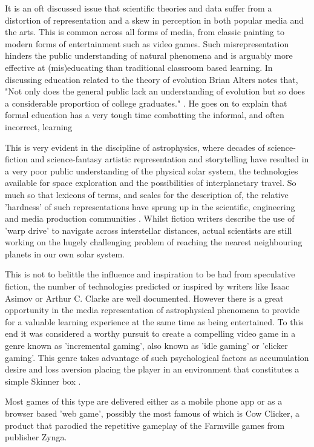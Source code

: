 \documentclass[twoside]{bhamthesis}
\begin{document}
It is an oft discussed issue that scientific theories and data suffer from a distortion of representation and a skew in perception in both popular media and the arts. This is common across all forms of media, from classic painting to modern forms of entertainment such as video games. Such misrepresentation hinders the public understanding of natural phenomena and is arguably more effective at (mis)educating than traditional classroom based learning. In discussing education related to the theory of evolution Brian Alters notes that, "Not only does the general public lack an understanding of evolution but so does a considerable proportion of college graduates." \cite{alters_perspective:_2002}. He goes on to explain that formal education has a very tough time combatting the informal, and often incorrect, learning 

This is very evident in the discipline of astrophysics, where decades of science-fiction and science-fantasy artistic representation and storytelling have resulted in a very poor public understanding of the physical solar system, the technologies available for space exploration and the possibilities of interplanetary travel. So much so that lexicons of terms, and scales for the description of, the relative 'hardness' of such representations have sprung up in the scientific, engineering and media production communities \cite{_mohs_????}. Whilst fiction writers describe the use of 'warp drive' to navigate across interstellar distances, actual scientists are still working on the hugely challenging problem of reaching the nearest neighbouring planets in our own solar system.

This is not to belittle the influence and inspiration to be had from speculative fiction, the number of technologies predicted or inspired by writers like Isaac Asimov or Arthur C. Clarke are well documented. However there is a great opportunity in the media representation of astrophysical phenomena to provide for a valuable learning experience at the same time as being entertained. To this end it was considered a worthy pursuit to create a compelling video game in a genre known as 'incremental gaming', also known as 'idle gaming' or 'clicker gaming'. This genre takes advantage of such psychological factors  as accumulation desire and loss aversion placing the player in an environment that constitutes a simple Skinner box \cite{carlson_psychology:_2009}.

Most games of this type are delivered either as a mobile phone app or as a browser based 'web game', possibly the most famous of which is Cow Clicker, a product that parodied the repetitive gameplay of the Farmville games from publisher Zynga.
\end{document}
